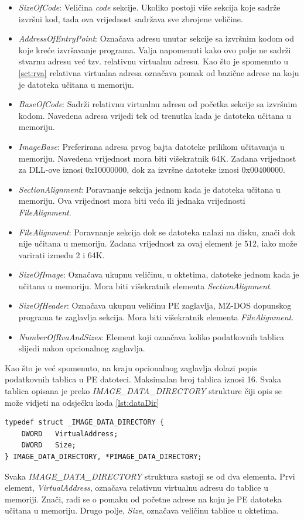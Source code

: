 \documentclass[times, utf8, diplomski, numeric]{fer}
\begin{document}
\begin{itemize}
\item \emph{SizeOfCode}: Veličina \emph{code} sekcije. Ukoliko postoji više sekcija koje sadrže izvršni kod, tada ova vrijednost sadržava sve zbrojene veličine.
\item \emph{AddressOfEntryPoint}: Označava adresu unutar sekcije sa izvršnim kodom od koje kreće izvršavanje programa. Valja napomenuti kako ovo polje ne sadrži stvarnu adresu već tzv. relativnu virtualnu adresu. Kao što je spomenuto u \ref{sct:rva} relativna virtualna adresa označava pomak od bazične adrese na koju je datoteka učitana u memoriju.
\item \emph{BaseOfCode}: Sadrži relativnu virtualnu adresu od početka sekcije sa izvršnim kodom. Navedena adresa vrijedi tek od trenutka kada je datoteka učitana u memoriju.
\item \emph{ImageBase}: Preferirana adresa prvog bajta datoteke prilikom učitavanja u memoriju. Navedena vrijednost mora biti višekratnik 64K. Zadana vrijednost za DLL-ove iznosi 0x10000000, dok za izvršne datoteke iznosi 0x00400000.
\item \emph{SectionAlignment}: Poravnanje sekcija jednom kada je datoteka učitana u memoriju. Ova vrijednost mora biti veća ili jednaka vrijednosti \emph{FileAlignment}.
\item \emph{FileAlignment}: Poravnanje sekcija dok se datoteka nalazi na disku, znači dok nije učitana u memoriju. Zadana vrijednost za ovaj element je 512, iako može varirati između 2 i 64K.
\item \emph{SizeOfImage}: Označava ukupnu veličinu, u oktetima, datoteke jednom kada je učitana u memoriju. Mora biti višekratnik elementa \emph{SectionAlignment}.
\item \emph{SizeOfHeader}: Označava ukupnu veličinu PE zaglavlja, MZ-DOS dopunskog programa te zaglavlja sekcija. Mora biti višekratnik elementa \emph{FileAlignment}.
\item \emph{NumberOfRvaAndSizes}: Element koji označava koliko podatkovnih tablica slijedi nakon opcionalnog zaglavlja.
\end{itemize}
Kao što je već spomenuto, na kraju opcionalnog zaglavlja dolazi popis podatkovnih tablica u PE datoteci. Maksimalan broj tablica iznosi 16. Svaka tablica opisana je preko \emph{IMAGE\_DATA\_DIRECTORY} strukture čiji opis se može vidjeti na odsječku koda \ref{lst:dataDir}

\begin{lstlisting}[frame=single, caption=IMAGE\_DATA\_DIRECTORY struktura, label={lst:dataDir}]
typedef struct _IMAGE_DATA_DIRECTORY {
	DWORD   VirtualAddress;
	DWORD   Size;
} IMAGE_DATA_DIRECTORY, *PIMAGE_DATA_DIRECTORY;
\end{lstlisting}
Svaka \emph{IMAGE\_DATA\_DIRECTORY} struktura sastoji se od dva	 elementa. Prvi element, \emph{VirtualAddress}, označava relativnu virtualnu adresu do tablice u memoriji. Znači, radi se o pomaku od početne adrese na koju je PE datoteka učitana u memoriju. Drugo polje, \emph{Size}, označava veličinu tablice u oktetima.
\end{document}

